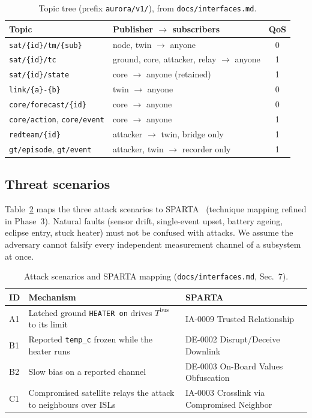 \documentclass[conference]{IEEEtran}
\newcommand{\file}[1]{\texttt{#1}}
\begin{document}
\begin{table}[t]
\caption{Topic tree (prefix \texttt{aurora/v1/}), from \file{docs/interfaces.md}.}
\label{tab:topics}
\centering
\footnotesize
\setlength{\tabcolsep}{3pt}
\begin{tabular}{@{}llc@{}}
\toprule
Topic & Publisher $\rightarrow$ subscribers & QoS \\
\midrule
\texttt{sat/\{id\}/tm/\{sub\}} & node, twin $\rightarrow$ anyone & 0 \\
\texttt{sat/\{id\}/tc} & ground, core, attacker, relay $\rightarrow$ anyone & 1 \\
\texttt{sat/\{id\}/state} & core $\rightarrow$ anyone (retained) & 1 \\
\texttt{link/\{a\}-\{b\}} & twin $\rightarrow$ anyone & 0 \\
\texttt{core/forecast/\{id\}} & core $\rightarrow$ anyone & 0 \\
\texttt{core/action}, \texttt{core/event} & core $\rightarrow$ anyone & 1 \\
\texttt{redteam/\{id\}} & attacker $\rightarrow$ twin, bridge only & 1 \\
\texttt{gt/episode}, \texttt{gt/event} & attacker, twin $\rightarrow$ recorder only & 1 \\
\bottomrule
\end{tabular}
\end{table}

\subsection{Threat scenarios}
Table~\ref{tab:scenarios} maps the three attack scenarios to SPARTA~\cite{sparta} (technique mapping
refined in Phase~3). Natural faults (sensor drift, single-event upset, battery ageing, eclipse entry,
stuck heater) must not be confused with attacks. We assume the adversary cannot falsify every
independent measurement channel of a subsystem at once.

\begin{table}[t]
\caption{Attack scenarios and SPARTA mapping (\file{docs/interfaces.md}, Sec.~7).}
\label{tab:scenarios}
\centering
\footnotesize
\setlength{\tabcolsep}{3pt}
\begin{tabular}{@{}p{8mm}p{36mm}p{30mm}@{}}
\toprule
ID & Mechanism & SPARTA \\
\midrule
A1 & Latched ground \texttt{HEATER on} drives $T^{\mathrm{bus}}$ to its limit & IA-0009 Trusted Relationship \\
B1 & Reported \texttt{temp\_c} frozen while the heater runs & DE-0002 Disrupt/Deceive Downlink \\
B2 & Slow bias on a reported channel & DE-0003 On-Board Values Obfuscation \\
C1 & Compromised satellite relays the attack to neighbours over ISLs & IA-0003 Crosslink via Compromised Neighbor \\
\bottomrule
\end{tabular}
\end{table}
\end{document}
